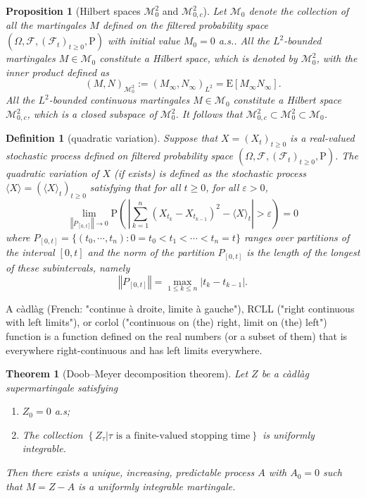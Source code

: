 \documentclass{report}
\newtheorem{definition}{Definition}[section]
\newtheorem{proposition}{Proposition}[section]
\newtheorem{theorem}{Theorem}[section]
\theoremstyle{nonumberplain}
\begin{document}
\begin{proposition}[Hilbert spaces $\mathscr{M}^2_0$ and $\mathscr{M}^2_{0,c}$]
Let $\mathscr{M}_0$ denote the collection of all the martingales $M$ defined on the filtered probability space $(\Omega,\mathcal{F},(\mathcal{F}_{t})_{t\ge0},\mathrm{P})$ with initial value $M_0=0$ a.s.. All the $L^2$-bounded martingales $M\in\mathscr{M}_0$ constitute a Hilbert space, which is denoted by $\mathscr{M}^2_{0}$, with the inner product defined as 
$$
 (M, N)_{\mathscr{M}^2_{0}}:=\left( M_{\infty}, N_{\infty}\right)_{L^{2}}=\mathrm{E}\left[M_{\infty} N_{\infty}\right].
$$
All the $L^2$-bounded continuous martingales $M\in\mathscr{M}_0$ constitute a Hilbert space $\mathscr{M}^2_{0,c}$, which is a closed subspace of $\mathscr{M}^2_{0}$. It follows that $\mathscr{M}^2_{0,c}\subset\mathscr{M}^2_{0}\subset\mathscr{M}_{0}$.
\end{proposition}

\begin{definition}[quadratic variation]	
	Suppose that $X=(X_t)_{t\ge 0}$ is a real-valued stochastic process defined on filtered probability space $(\Omega,\mathcal{F},(\mathcal{F}_{t})_{t\ge0},\mathrm{P})$. The \emph{quadratic variation} of $X$ (if exists) is defined as the stochastic process $\langle X\rangle=(\langle X\rangle_{t})_{t\ge0}$ satisfying that for all $t\ge0$, for all $\varepsilon>0$,
	\[
	\lim_{\left\Vert P_{[0,t]}\right\Vert \rightarrow 0}\mathrm{P}\left(\,\left|\sum _{k=1}^{n}(X_{t_{k}}-X_{t_{k-1}})^{2}-\langle X\rangle_{t}\right|>\varepsilon\right)=0
	\] 
	where $P_{[0,t]}=\{(t_0,\cdots,t_n):0=t_0<t_1<\cdots<t_n=t\}$ ranges over partitions of the interval $[0,t]$ and the norm of the partition $P_{[0,t]}$ is the length of the longest of these subintervals, namely
	\[
	\left\Vert P_{[0,t]}\right\Vert=\max\limits_{1\le k\le n}{|t_k-t_{k-1}|}.
	\]
\end{definition}

A càdlàg (French: "continue à droite, limite à gauche"), RCLL ("right continuous with left limits"), or corlol ("continuous on (the) right, limit on (the) left") function is a function defined on the real numbers (or a subset of them) that is everywhere right-continuous and has left limits everywhere.

\begin{theorem}[Doob–Meyer decomposition theorem]
Let $Z$ be a càdlàg supermartingale satisfying
\begin{enumerate}
	\item $Z_0=0$ a.s;
	\item The collection $\left\{Z_{\tau}| \tau \text { is a finite-valued stopping time}\right\}$ is uniformly integrable.
\end{enumerate}
Then there exists a unique, increasing, predictable process $A$ with $A_{0}=0$ such that $M=Z-A$ is a uniformly integrable martingale.
\end{theorem}
\end{document}
